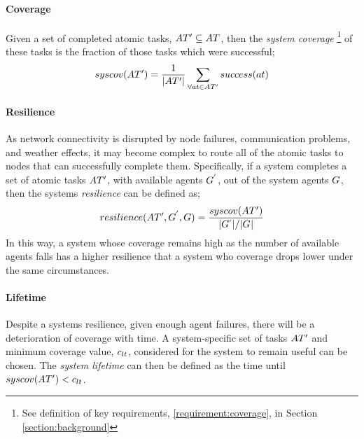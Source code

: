 \paragraph{Coverage}
\label{section:coverage}
Given a set of completed atomic tasks, $\setAtomicTaskInstance{}{} \subseteq \setAtomicTask{}{}$, then the \textit{system coverage} \footnote{See definition of key requirements, \ref{requirement:coverage}, in Section \ref{section:background}} of these tasks is the fraction of those tasks which were successful;
\begin{equation}
	\label{eq:coverage}
	\functionSystemCoverage{}{}
	=
	\frac{1}{\funcSize{\setAtomicTaskInstance{}{}}}
	\sum\limits_{\forall \varAtomicTask{}{} \in \setAtomicTaskInstance{}{}}
	\functionAtomicTaskSuccess{}{}
\end{equation}

\newcommand{\functionSymbolResilence}[2]{\functionSymbol{resilience}{#1}{#2}}
\newcommand{\functionResilence}[2]{
	\functionSignature{\functionSymbolResilence{#1}{#2}}
	{\setAtomicTaskInstance{}{}, \setAgent{}{'}, \setAgent{}{} }
}
\paragraph{Resilience}
\label{section:resilience}
As network connectivity is disrupted by node failures, communication problems, and weather effects, it may become complex to route all of the atomic tasks to nodes that can successfully complete them. Specifically, if a system completes a set of atomic tasks $\setAtomicTaskInstance{}{}$, with available agents $\setAgent{}{'}$, out of the system agents $\setAgent{}{}$, then the systems \textit{resilience} can be defined as; 
\begin{equation}
	\functionResilence{}{}
	= 
	\frac{
		\functionSystemCoverage{}{}
	}{
		\funcSize{\setAgents{}{'}} / \funcSize{\setAgents{}{}}
	}
\end{equation}
In this way, a system whose coverage remains high as the number of available agents falls has a higher resilience that a system who coverage drops lower under the same circumstances.

 \paragraph{Lifetime}
 \label{section:lifetime}
 \newcommand{\varCoverageMinimum}[2]{\varSymbol{c}{lt}{}}
 Despite a systems resilience, given enough agent failures, there will be a deterioration of coverage with time. A system-specific set of tasks $\setAtomicTaskInstance{}{}$ and minimum coverage value, $\varCoverageMinimum{}{}$, considered for the system to remain useful can be chosen. The \textit{system lifetime} can then be defined as the time until $\functionSystemCoverage{}{} < \varCoverageMinimum{}{}$.
 


